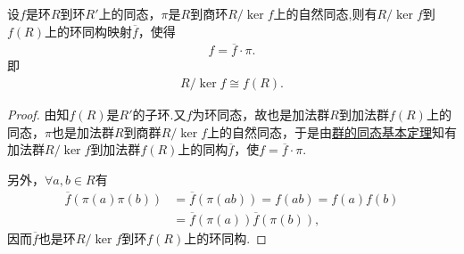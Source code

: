 \documentclass[../../main.tex]{subfiles}%
\begin{document}
\begin{theorem}[环的同态基本定理]\label{theorem:环的同态基本定理}
设$f$是环$R$到环$R'$上的同态，$\pi$是$R$到商环$R/\ker f$上的自然同态,则有$R/\ker f$到$f(R)$上的环同构映射$\overline{f}$，使得
\begin{align}
f = \overline{f} \cdot \pi. \label{eq:1ger4wg34wgg54.7.g890u34349n8v4b6}
\end{align}
即
\begin{align*}
R/\ker f \cong f(R).
\end{align*}
\end{theorem}
\begin{proof}
由知$f(R)$是$R'$的子环.又$f$为环同态，故也是加法群$R$到加法群$f(R)$上的同态，$\pi$也是加法群$R$到商群$R/\ker f$上的自然同态，于是由\hyperref[theorem:群的同态基本定理]{群的同态基本定理}知有加法群$R/\ker f$到加法群$f(R)$上的同构$\overline{f}$，使$f = \overline{f} \cdot \pi$.

另外，$\forall a,b \in R$有
\begin{align*}
\overline{f}(\pi(a)\pi(b)) &= \overline{f}(\pi(ab)) = f(ab) = f(a)f(b) \\
&= \overline{f}(\pi(a))\overline{f}(\pi(b)),
\end{align*}
因而$\overline{f}$也是环$R/\ker f$到环$f(R)$上的环同构.

\end{proof}
\end{document}
